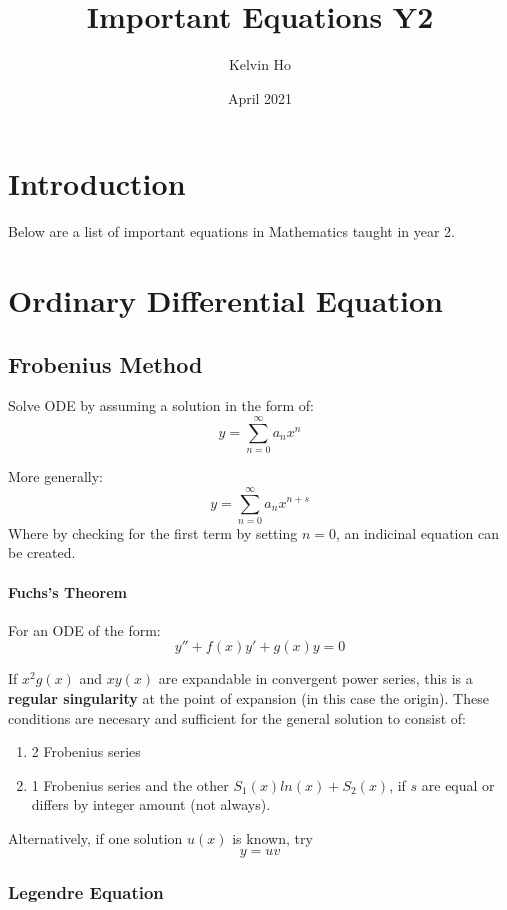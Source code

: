 \documentclass[12pt]{article}
\title{Important Equations Y2}
\author{Kelvin Ho}
\date{April 2021}
\begin{document}
\maketitle

\section{Introduction}
Below are a list of important equations in Mathematics taught in year 2.



\section{Ordinary Differential Equation}

\subsection{Frobenius Method}
Solve ODE by assuming a solution in the form of: \[y = \sum_{n=0}^{\infty} a_n x^n\]

More generally:
\[y = \sum_{n=0}^{\infty} a_n x^{n+s}\]
Where by checking for the first term by setting $n=0$, an indicinal equation can be created. 

\paragraph{Fuchs's Theorem}

For an ODE of the form:
\[ y'' + f(x)y' + g(x) y = 0\]

If $x^2g(x)$ and $xy(x)$ are expandable in convergent power series, this is a \textbf{regular singularity} at the point of expansion (in this case the origin). These conditions are necesary and sufficient for the general solution to consist of:
\begin{enumerate}
    \item 2 Frobenius series
    \item 1 Frobenius series and the other $S_1(x)ln(x) + S_2(x)$, if $s$ are equal or differs by integer amount (not always).
\end{enumerate}

Alternatively, if one solution $u(x)$ is known, try \[y = uv \]


\subsubsection{Legendre Equation}
\end{document}
